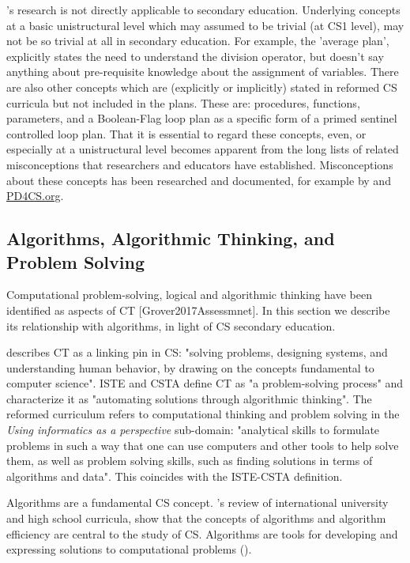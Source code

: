 \citeauthor{deRaadt2009teachingPlans}'s research is not directly applicable to secondary education. Underlying concepts at a basic unistructural level which may assumed to be trivial (at CS1 level), may not be so trivial at all in secondary education. For example, the 'average plan', explicitly states the need to understand the division operator, but doesn't say anything about pre-requisite knowledge about the assignment of variables. There are also other concepts which are (explicitly or implicitly) stated in reformed CS curricula but not included in the plans. These are: procedures, functions, parameters, and a Boolean-Flag loop plan as a specific form of a primed sentinel controlled loop plan. That it is essential to regard these concepts, even, or especially at a unistructural level becomes apparent from the long lists of related misconceptions that researchers and educators have established. Misconceptions about these concepts has been researched and documented, for example by \citeauthor{sorva2012misconceptions} and \url{PD4CS.org}.



\subsection{Algorithms, Algorithmic Thinking, and Problem Solving}
Computational problem-solving, logical and algorithmic thinking have been identified as aspects of CT [Grover2017Assessmnet]. In this section we describe its relationship with algorithms, in light of CS secondary education.


 describes CT as a linking pin in CS: "solving problems, designing systems, and understanding human behavior, by drawing on the concepts fundamental to computer science". ISTE and CSTA define CT as "a problem-solving process"\cite{CSTA2011CT} and characterize it as "automating solutions through algorithmic thinking". The reformed curriculum refers to computational thinking and problem solving in the \emph{Using informatics as a perspective} sub-domain: "analytical skills to formulate problems in such a way that one can use computers and other tools to help solve them, as well as problem solving skills,
such as finding solutions in terms of algorithms and data"\cite{Barendsen2016}. This coincides with the ISTE-CSTA definition.




Algorithms are a fundamental CS concept. 's review of international university and high school curricula, show that the concepts of algorithms and algorithm efficiency are central to the study of CS. Algorithms are tools for developing and expressing solutions to computational problems (\cite{GroverPea2013}).


